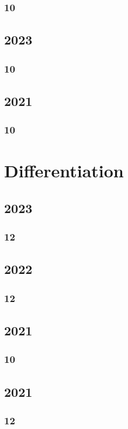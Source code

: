 \documentclass[11pt]{book}
\begin{document}
\subsection{10}

\section{2023}
\subsection{10}

\section{2021}
\subsection{10}



\chapter{Differentiation}
\section{2023}
\subsection{12}


\section{2022}
\subsection{12}

\section{2021}
\subsection{10}

\section{2021}
\subsection{12}

\end{document}
